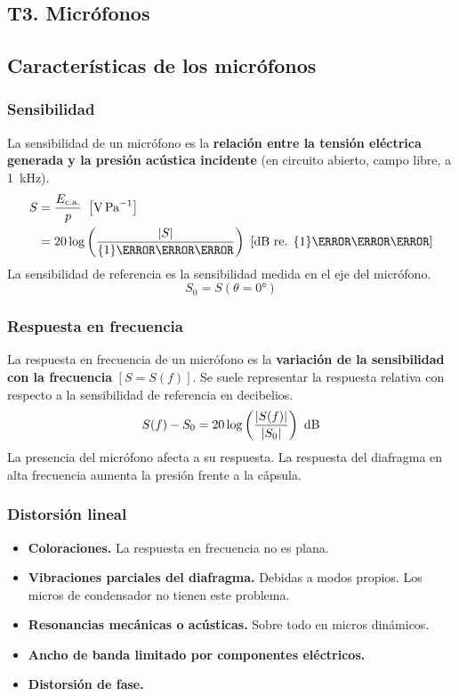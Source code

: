 \documentclass[a4paper, 8pt]{extarticle}
\begin{document}
\setlength{\parskip}{0pt}
\setlength{\parindent}{0pt}
\setlength{\abovedisplayskip}{2pt}
\setlength{\belowdisplayskip}{2pt}
\setlength{\abovedisplayshortskip}{0pt}
\setlength{\belowdisplayshortskip}{0pt}


\pagestyle{empty}
\renewcommand{\arraystretch}{1.5}

\begin{multicols}{3}
  \section{T3. Micrófonos}
  \subsection{Características de los micrófonos}
  \subsubsection{Sensibilidad}
  La sensibilidad de un micrófono es la \textbf{relación entre la tensión eléctrica generada y la presión acústica incidente} (en circuito abierto, campo libre, a \qty{1}{\kilo\hertz}).
  \begin{align*}
    S & = \frac{E_{\text{c.a.}}}{p} \ \left[ \unit{\volt \per \pascal }  \right]                                                                            \\
      & = 20 \log \left( \frac{\abs{S}}{\qty{1}{\volt \per \pascal  } } \right) \ \left[ \unit{\decibel} \text{ re. } \qty{1}{\volt \per \pascal }  \right]
  \end{align*}
  La sensibilidad de referencia es la sensibilidad medida en el eje del micrófono.
  \[ S_0 = S \left( \theta = \ang{0} \right) \]
  \subsubsection{Respuesta en frecuencia}
  La respuesta en frecuencia de un micrófono es la \textbf{variación de la sensibilidad con la frecuencia} $\left[ S = S(f) \right]$. Se suele representar la respuesta relativa con respecto a la sensibilidad de referencia en decibelios.
  \[ S(f) - S_0 = 20 \log \left( \frac{\abs{S(f)}}{\abs{S_0}} \right) \ \unit{\dB} \]
  La presencia del micrófono afecta a su respuesta. La respuesta del diafragma en alta frecuencia aumenta la presión frente a la cápsula.
  \subsubsection{Distorsión lineal}
  \begin{itemize}
    \item \textbf{Coloraciones.} La respuesta en frecuencia no es plana.
    \item \textbf{Vibraciones parciales del diafragma.} Debidas a modos propios. Los micros de condensador no tienen este problema.
    \item \textbf{Resonancias mecánicas o acústicas.} Sobre todo en micros dinámicos.
    \item \textbf{Ancho de banda limitado por componentes eléctricos.}
    \item \textbf{Distorsión de fase.}
  \end{itemize}

\end{multicols}
\end{document}
